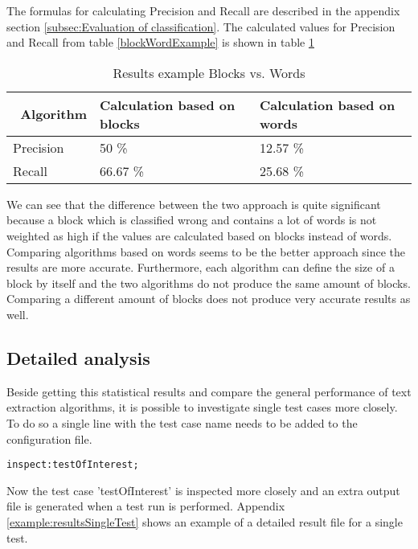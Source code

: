 The formulas for calculating Precision and Recall are described in the appendix section \ref{subsec:Evaluation of classification}.
The calculated values for Precision and Recall from table \ref{blockWordExample} is shown in table \ref{ResultsBlockWordExample}

\begin{table}[!ht]
\begin{tabular}{| p{3cm} | p{5cm} | p{5cm} | }
    \hline
    \ \textbf{Algorithm}  & \textbf{Calculation based on blocks}  & \textbf{Calculation based on words} 				\\ \hline
    Precision     & 50 \%    	&  12.57 \%	\\ \hline
    Recall & 66.67 \%    	&  25.68 \%	\\ \hline
\end{tabular}
\caption{Results example Blocks vs. Words}
\label{ResultsBlockWordExample}
\end{table}

We can see that the difference between the two approach is quite significant because a block which is classified wrong and contains a lot of words is not weighted as high if the values are calculated based on blocks instead of words. 
Comparing algorithms based on words seems to be the better approach since the results are more accurate. Furthermore, each algorithm can define the size of a block by itself and the two algorithms do not produce the same amount of blocks. Comparing a different amount of blocks does not produce very accurate results as well.  

\subsection{Detailed analysis}
\label{subsec:Detailed Analysis}

Beside getting this statistical results and compare the general performance of text extraction algorithms, it is possible to investigate single test cases more closely. To do so a single line with the test case name needs to be added to the configuration file.

\begin{lstlisting}
inspect:testOfInterest;
\end{lstlisting}

Now the test case 'testOfInterest' is inspected more closely and an extra output file is generated when a test run is performed. Appendix \ref{example:resultsSingleTest} shows an example of a detailed result file for a single test.

